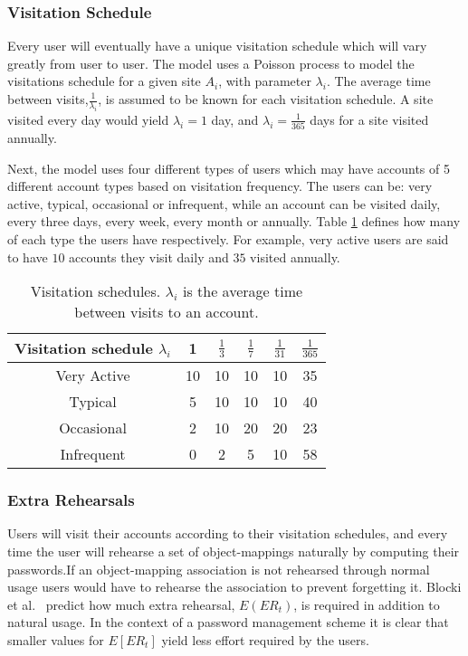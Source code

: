 \subsubsection{Visitation Schedule}
Every user will eventually have a unique visitation schedule which will vary greatly from user to user. The model uses a Poisson process to model the visitations schedule for a given site $A_i$, with parameter $\lambda_i$. The average time between visits,$\frac{1}{\lambda_i}$, is assumed to be known for each visitation schedule. A site visited every day would yield $\lambda_i = 1$ day, and $\lambda_i=\frac{1}{365}$ days for a site visited annually. 
\par Next, the model uses four different types of users which may have accounts of 5 different account types based on visitation frequency. The users can be: very active, typical, occasional or infrequent, while an account can be visited daily, every three days, every week, every month or annually. Table \ref{users} defines how many of each type the users have respectively. For example, very active users are said to have $10$ accounts they visit daily and $35$ visited annually.

\begin{table}[ht]
    \centering
\begin{tabular}{|c||c|c|c|c|c|}
    \hline
    Visitation schedule $\lambda_i$ & 1 & $\frac{1}{3}$ & $\frac{1}{7}$ & $\frac{1}{31}$ & $\frac{1}{365}$ \\
    \hline \hline
    Very Active & 10 &10 &10 &10 & 35 \\
    \hline
    Typical & 5 & 10 & 10 & 10 & 40 \\
    \hline
    Occasional & 2 & 10 & 20 & 20 & 23 \\
    \hline
    Infrequent & 0 & 2 & 5 & 10 &  58 \\
    \hline
\end{tabular}
\caption{Visitation schedules. $\lambda_i$ is the average time between visits to an account.}
\label{users}
\end{table}


\subsubsection{Extra Rehearsals}
Users will visit their accounts according to their visitation schedules, and every time the user will rehearse a set of object-mappings naturally by computing their passwords.If an object-mapping association is not rehearsed through normal usage users would have to rehearse the association to prevent forgetting it. Blocki et al.~\cite{naturally-rehearsing} predict how much extra rehearsal, $E(ER_t)$, is required in addition to natural usage. In the context of a password management scheme it is clear that smaller values for $E[ER_t]$ yield less effort required by the users.

